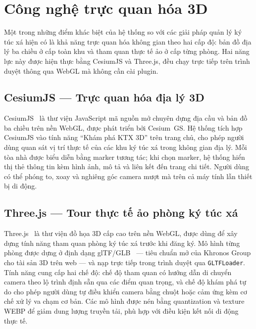 \documentclass[../DoAn.tex]{subfiles}
\begin{document}
\section{Công nghệ trực quan hóa 3D}
\label{sec:visualization}

Một trong những điểm khác biệt của hệ thống so với các giải pháp quản lý ký
túc xá hiện có là khả năng trực quan hóa không gian theo hai cấp độ: bản đồ
địa lý ba chiều ở cấp toàn khu và tham quan thực tế ảo ở cấp từng phòng. Hai
năng lực này được hiện thực bằng CesiumJS và Three.js, đều chạy trực tiếp trên
trình duyệt thông qua WebGL mà không cần cài plugin.

\subsection{CesiumJS --- Trực quan hóa địa lý 3D}
\label{subsec:cesium}

CesiumJS~\cite{cesiumjs} là thư viện JavaScript mã nguồn mở chuyên dựng địa
cầu và bản đồ ba chiều trên nền WebGL, được phát triển bởi Cesium~GS. Hệ thống
tích hợp CesiumJS vào tính năng ``Khám phá KTX 3D'' trên trang chủ, cho phép
người dùng quan sát vị trí thực tế của các khu ký túc xá trong không gian địa
lý. Mỗi tòa nhà được biểu diễn bằng marker tương tác; khi chọn marker, hệ
thống hiển thị thẻ thông tin kèm hình ảnh, mô tả và liên kết đến trang chi
tiết. Người dùng có thể phóng to, xoay và nghiêng góc camera mượt mà trên cả
máy tính lẫn thiết bị di động.

\subsection{Three.js --- Tour thực tế ảo phòng ký túc xá}
\label{subsec:threejs}

Three.js~\cite{threejs} là thư viện đồ họa 3D cấp cao trên nền WebGL, được
dùng để xây dựng tính năng tham quan phòng ký túc xá trước khi đăng ký. Mô
hình từng phòng được dựng ở định dạng glTF/GLB~\cite{khronos_gltf} --- tiêu
chuẩn mở của Khronos Group cho tài sản 3D trên web --- và nạp trực tiếp trong
trình duyệt qua \texttt{GLTFLoader}. Tính năng cung cấp hai chế độ: chế độ
tham quan có hướng dẫn di chuyển camera theo lộ trình định sẵn qua các điểm
quan trọng, và chế độ khám phá tự do cho phép người dùng tự điều khiển camera
bằng chuột hoặc cảm ứng kèm cơ chế xử lý va chạm cơ bản. Các mô hình được
nén bằng quantization và texture WEBP để giảm dung lượng truyền tải, phù hợp
với điều kiện kết nối di động thực tế.
\end{document}
